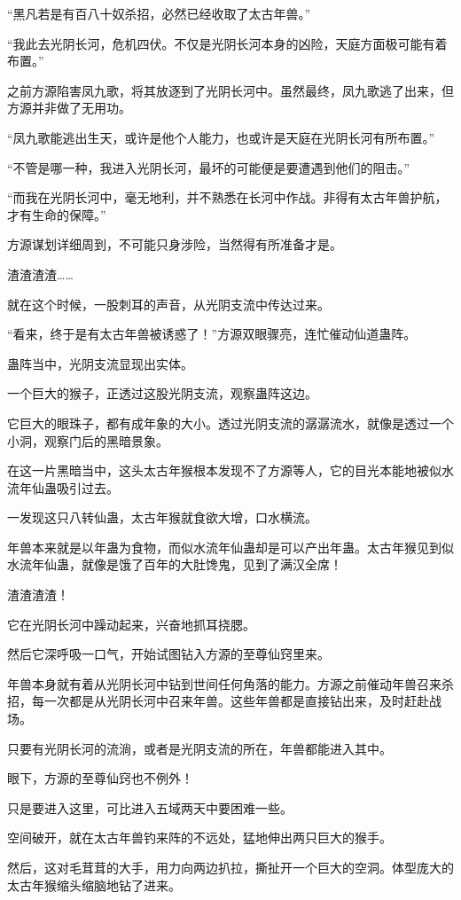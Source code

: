 \begin{this_body}
“黑凡若是有百八十奴杀招，必然已经收取了太古年兽。”

“我此去光阴长河，危机四伏。不仅是光阴长河本身的凶险，天庭方面极可能有着布置。”

之前方源陷害凤九歌，将其放逐到了光阴长河中。虽然最终，凤九歌逃了出来，但方源并非做了无用功。

“凤九歌能逃出生天，或许是他个人能力，也或许是天庭在光阴长河有所布置。”

“不管是哪一种，我进入光阴长河，最坏的可能便是要遭遇到他们的阻击。”

“而我在光阴长河中，毫无地利，并不熟悉在长河中作战。非得有太古年兽护航，才有生命的保障。”

方源谋划详细周到，不可能只身涉险，当然得有所准备才是。

渣渣渣渣……

就在这个时候，一股刺耳的声音，从光阴支流中传达过来。

“看来，终于是有太古年兽被诱惑了！”方源双眼骤亮，连忙催动仙道蛊阵。

蛊阵当中，光阴支流显现出实体。

一个巨大的猴子，正透过这股光阴支流，观察蛊阵这边。

它巨大的眼珠子，都有成年象的大小。透过光阴支流的潺潺流水，就像是透过一个小洞，观察门后的黑暗景象。

在这一片黑暗当中，这头太古年猴根本发现不了方源等人，它的目光本能地被似水流年仙蛊吸引过去。

一发现这只八转仙蛊，太古年猴就食欲大增，口水横流。

年兽本来就是以年蛊为食物，而似水流年仙蛊却是可以产出年蛊。太古年猴见到似水流年仙蛊，就像是饿了百年的大肚馋鬼，见到了满汉全席！

渣渣渣渣！

它在光阴长河中躁动起来，兴奋地抓耳挠腮。

然后它深呼吸一口气，开始试图钻入方源的至尊仙窍里来。

年兽本身就有着从光阴长河中钻到世间任何角落的能力。方源之前催动年兽召来杀招，每一次都是从光阴长河中召来年兽。这些年兽都是直接钻出来，及时赶赴战场。

只要有光阴长河的流淌，或者是光阴支流的所在，年兽都能进入其中。

眼下，方源的至尊仙窍也不例外！

只是要进入这里，可比进入五域两天中要困难一些。

空间破开，就在太古年兽钓来阵的不远处，猛地伸出两只巨大的猴手。

然后，这对毛茸茸的大手，用力向两边扒拉，撕扯开一个巨大的空洞。体型庞大的太古年猴缩头缩脑地钻了进来。


\end{this_body}

